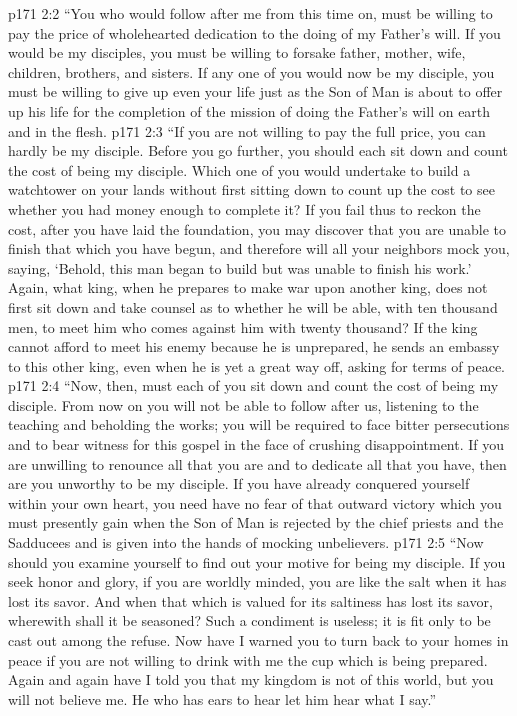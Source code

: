 \pc \vs p171 2:2 \textcolor{ubdarkred}{“You who would follow after me from this time on, must be willing to pay the price of wholehearted dedication to the doing of my Father’s will. If you would be my disciples, you must be willing to forsake father, mother, wife, children, brothers, and sisters. If any one of you would now be my disciple, you must be willing to give up even your life just as the Son of Man is about to offer up his life for the completion of the mission of doing the Father’s will on earth and in the flesh.}
\vs p171 2:3 \textcolor{ubdarkred}{“If you are not willing to pay the full price, you can hardly be my disciple. Before you go further, you should each sit down and count the cost of being my disciple. Which one of you would undertake to build a watchtower on your lands without first sitting down to count up the cost to see whether you had money enough to complete it? If you fail thus to reckon the cost, after you have laid the foundation, you may discover that you are unable to finish that which you have begun, and therefore will all your neighbors mock you, saying, ‘Behold, this man began to build but was unable to finish his work.’ Again, what king, when he prepares to make war upon another king, does not first sit down and take counsel as to whether he will be able, with ten thousand men, to meet him who comes against him with twenty thousand? If the king cannot afford to meet his enemy because he is unprepared, he sends an embassy to this other king, even when he is yet a great way off, asking for terms of peace.}
\vs p171 2:4 \textcolor{ubdarkred}{“Now, then, must each of you sit down and count the cost of being my disciple. From now on you will not be able to follow after us, listening to the teaching and beholding the works; you will be required to face bitter persecutions and to bear witness for this gospel in the face of crushing disappointment. If you are unwilling to renounce all that you are and to dedicate all that you have, then are you unworthy to be my disciple. If you have already conquered yourself within your own heart, you need have no fear of that outward victory which you must presently gain when the Son of Man is rejected by the chief priests and the Sadducees and is given into the hands of mocking unbelievers.}
\vs p171 2:5 \textcolor{ubdarkred}{“Now should you examine yourself to find out your motive for being my disciple. If you seek honor and glory, if you are worldly minded, you are like the salt when it has lost its savor. And when that which is valued for its saltiness has lost its savor, wherewith shall it be seasoned? Such a condiment is useless; it is fit only to be cast out among the refuse. Now have I warned you to turn back to your homes in peace if you are not willing to drink with me the cup which is being prepared. Again and again have I told you that my kingdom is not of this world, but you will not believe me. He who has ears to hear let him hear what I say.”}
